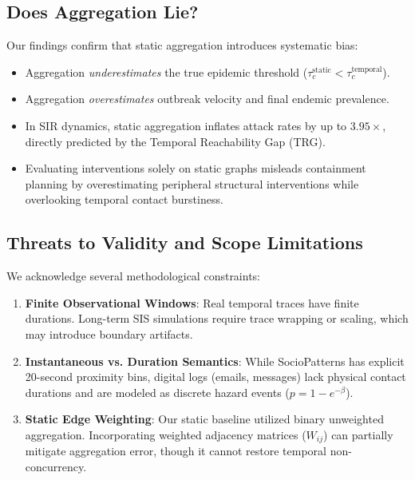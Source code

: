 \documentclass[conference]{IEEEtran}
\begin{document}
\subsection{Does Aggregation Lie?}
Our findings confirm that static aggregation introduces systematic bias:
\begin{itemize}
    \item Aggregation \textit{underestimates} the true epidemic threshold ($\tau_c^{\text{static}} < \tau_c^{\text{temporal}}$).
    \item Aggregation \textit{overestimates} outbreak velocity and final endemic prevalence.
    \item In SIR dynamics, static aggregation inflates attack rates by up to $3.95\times$, directly predicted by the Temporal Reachability Gap (TRG).
    \item Evaluating interventions solely on static graphs misleads containment planning by overestimating peripheral structural interventions while overlooking temporal contact burstiness.
\end{itemize}

\subsection{Threats to Validity and Scope Limitations}
We acknowledge several methodological constraints:
\begin{enumerate}
    \item \textbf{Finite Observational Windows}: Real temporal traces have finite durations. Long-term SIS simulations require trace wrapping or scaling, which may introduce boundary artifacts.
    \item \textbf{Instantaneous vs. Duration Semantics}: While SocioPatterns has explicit 20-second proximity bins, digital logs (emails, messages) lack physical contact durations and are modeled as discrete hazard events ($p = 1 - e^{-\beta}$).
    \item \textbf{Static Edge Weighting}: Our static baseline utilized binary unweighted aggregation. Incorporating weighted adjacency matrices ($W_{ij}$) can partially mitigate aggregation error, though it cannot restore temporal non-concurrency.
\end{enumerate}
\end{document}
